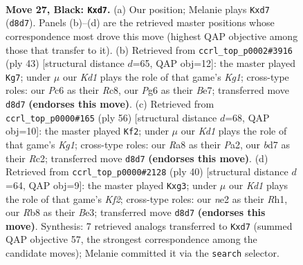 \documentclass[11pt]{article}
\begin{document}
\clearpage

\begin{figure}[p]\centering
\begin{subfigure}{0.46\textwidth}\centering
\resizebox{\linewidth}{!}{%
\newchessgame
\chessboard[
  setfen={rr1k2nb/p2B1p1p/P1p3p1/2P1p3/4P2P/5P2/4NB2/R4RK1 b - - 0 27},
  showmover=false,
  pgfstyle=straightmove, color=movearrow, markmove={d8-d7}
]}
\caption{}
\end{subfigure}\hfill
\begin{subfigure}{0.46\textwidth}\centering
\resizebox{\linewidth}{!}{%
\newchessgame
\chessboard[
  setfen={2rr2k1/1p2bp2/p5p1/7p/1P1p4/P2B3P/1P3PP1/2RR1K2 b - - 1 22},
  showmover=false,
  pgfstyle=straightmove, color=movearrow, markmove={g8-g7}
]}
\caption{}
\end{subfigure}
\\[4pt]
\begin{subfigure}{0.46\textwidth}\centering
\resizebox{\linewidth}{!}{%
\newchessgame
\chessboard[
  setfen={4rk2/1p4b1/2p3p1/1r3pN1/p2p1P2/3P2P1/PPR1P3/6KR w - - 2 29},
  showmover=false,
  pgfstyle=straightmove, color=movearrow, markmove={g1-f2}
]}
\caption{}
\end{subfigure}\hfill
\begin{subfigure}{0.46\textwidth}\centering
\resizebox{\linewidth}{!}{%
\newchessgame
\chessboard[
  setfen={2kr3r/2p2p1p/1p3p2/p7/P1b1P1PP/2P1BPb1/5K2/R6R w - - 0 21},
  showmover=false,
  pgfstyle=straightmove, color=movearrow, markmove={f2-g3}
]}
\caption{}
\end{subfigure}
\caption{\textbf{Move 27, Black: \texttt{Kxd7}.} (a) Our position; Melanie plays \texttt{Kxd7} (\texttt{d8d7}). Panels (b)--(d) are the retrieved master positions whose correspondence most drove this move (highest QAP objective among those that transfer to it). (b) Retrieved from \texttt{ccrl\_top\_p0002\#3916} (ply 43) [structural distance $d$=65, QAP obj=12]: the master played \texttt{Kg7}; under $\mu$ our \emph{Kd1} plays the role of that game's \emph{Kg1}; cross-type roles: our \emph{P}c6 as their \emph{R}c8, our \emph{P}g6 as their \emph{B}e7; transferred move \texttt{d8d7} \textbf{(endorses this move)}. (c) Retrieved from \texttt{ccrl\_top\_p0000\#165} (ply 56) [structural distance $d$=68, QAP obj=10]: the master played \texttt{Kf2}; under $\mu$ our \emph{Kd1} plays the role of that game's \emph{Kg1}; cross-type roles: our \emph{R}a8 as their \emph{P}a2, our \emph{b}d7 as their \emph{R}c2; transferred move \texttt{d8d7} \textbf{(endorses this move)}. (d) Retrieved from \texttt{ccrl\_top\_p0000\#2128} (ply 40) [structural distance $d$=64, QAP obj=9]: the master played \texttt{Kxg3}; under $\mu$ our \emph{Kd1} plays the role of that game's \emph{Kf2}; cross-type roles: our \emph{n}e2 as their \emph{R}h1, our \emph{R}b8 as their \emph{B}e3; transferred move \texttt{d8d7} \textbf{(endorses this move)}. Synthesis: 7 retrieved analogs transferred to \texttt{Kxd7} (summed QAP objective 57, the strongest correspondence among the candidate moves); Melanie committed it via the \texttt{search} selector.}
\label{fig:thought-m53}
\end{figure}
\end{document}
